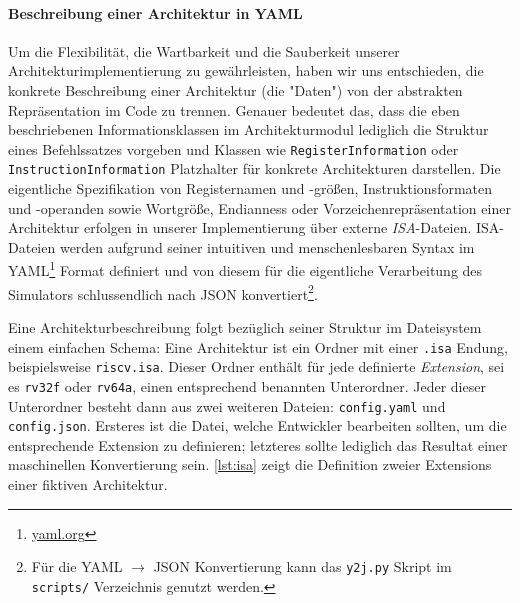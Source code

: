 
\paragraph{Beschreibung einer Architektur in YAML}
\label{dev:arch-yaml}

Um die Flexibilität, die Wartbarkeit und die Sauberkeit unserer
Architekturimplementierung zu gewährleisten, haben wir uns entschieden, die
konkrete Beschreibung einer Architektur (die "Daten") von der abstrakten
Repräsentation im Code zu trennen. Genauer bedeutet das, dass die eben
beschriebenen Informationsklassen im Architekturmodul lediglich die Struktur
eines Befehlssatzes vorgeben und Klassen wie \texttt{RegisterInformation} oder
\texttt{InstructionInformation} Platzhalter für konkrete Architekturen
darstellen. Die eigentliche Spezifikation von Registernamen und -größen,
Instruktionsformaten und -operanden sowie Wortgröße, Endianness oder
Vorzeichenrepräsentation einer Architektur erfolgen in unserer Implementierung
über externe \emph{ISA}-Dateien. ISA-Dateien werden aufgrund seiner intuitiven
und menschenlesbaren Syntax im YAML\footnote{\url{yaml.org}} Format definiert
und von diesem für die eigentliche Verarbeitung des Simulators schlussendlich
nach JSON konvertiert\footnote{Für die YAML $\rightarrow$ JSON Konvertierung kann das \texttt{y2j.py} Skript im \texttt{scripts/} Verzeichnis genutzt werden.}.

Eine Architekturbeschreibung folgt bezüglich seiner Struktur im Dateisystem
einem einfachen Schema: Eine Architektur ist ein Ordner mit einer \texttt{.isa}
Endung, beispielsweise \texttt{riscv.isa}. Dieser Ordner enthält für jede
definierte \emph{Extension}, sei es \texttt{rv32f} oder \texttt{rv64a}, einen
entsprechend benannten Unterordner. Jeder dieser Unterordner besteht dann aus
zwei weiteren Dateien: \texttt{config.yaml} und \texttt{config.json}. Ersteres
ist die Datei, welche Entwickler bearbeiten sollten, um die entsprechende
Extension zu definieren; letzteres sollte lediglich das Resultat einer
maschinellen Konvertierung sein. \autoref{lst:isa} zeigt die Definition zweier
Extensions einer fiktiven Architektur.


